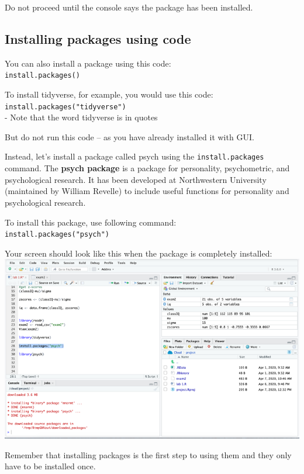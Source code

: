 \documentclass[
]{book}
\begin{document}
Do not proceed until the console says the package has been installed.

\hypertarget{installing-packages-using-code}{%
\subsection{Installing packages using code}\label{installing-packages-using-code}}

You can also install a package using this code:\\
\texttt{install.packages()}

To install tidyverse, for example, you would use this code:\\
\texttt{install.packages("tidyverse")}~\\
- Note that the word tidyverse is in quotes

But do not run this code -- as you have already installed it with GUI.

Instead, let's install a package called psych using the \texttt{install.packages} command. The \textbf{psych package} is a package for personality, psychometric, and psychological research. It has been developed at Northwestern University (maintained by William Revelle) to include useful functions for personality and psychological research.

To install this package, use following command:\\
\texttt{install.packages("psych")}

Your screen should look like this when the package is completely installed:\\
\includegraphics{img/instpsyc.png}

Remember that installing packages is the first step to using them and they only have to be installed once.
\end{document}
